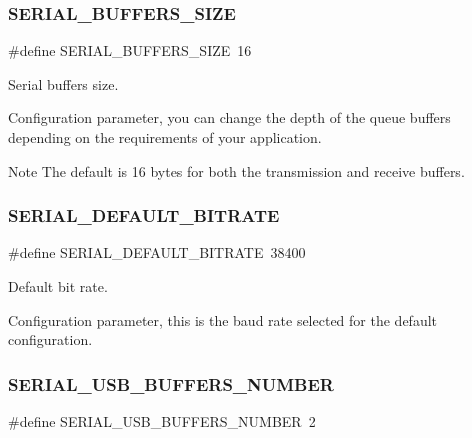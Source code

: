 \subsubsection{\texorpdfstring{S\+E\+R\+I\+A\+L\+\_\+\+B\+U\+F\+F\+E\+R\+S\+\_\+\+S\+I\+ZE}{SERIAL\_BUFFERS\_SIZE}}
{\footnotesize\ttfamily \#define S\+E\+R\+I\+A\+L\+\_\+\+B\+U\+F\+F\+E\+R\+S\+\_\+\+S\+I\+ZE~16}



Serial buffers size. 

Configuration parameter, you can change the depth of the queue buffers depending on the requirements of your application. \begin{DoxyNote}{Note}
The default is 16 bytes for both the transmission and receive buffers. 
\end{DoxyNote}
\hypertarget{group__HAL__CONF_gacb4c08ac23f83ac9d58c50ff840de516}{}\label{group__HAL__CONF_gacb4c08ac23f83ac9d58c50ff840de516} 
\subsubsection{\texorpdfstring{S\+E\+R\+I\+A\+L\+\_\+\+D\+E\+F\+A\+U\+L\+T\+\_\+\+B\+I\+T\+R\+A\+TE}{SERIAL\_DEFAULT\_BITRATE}}
{\footnotesize\ttfamily \#define S\+E\+R\+I\+A\+L\+\_\+\+D\+E\+F\+A\+U\+L\+T\+\_\+\+B\+I\+T\+R\+A\+TE~38400}



Default bit rate. 

Configuration parameter, this is the baud rate selected for the default configuration. \hypertarget{group__HAL__CONF_ga0c332b2493fd2106beb13425549120fe}{}\label{group__HAL__CONF_ga0c332b2493fd2106beb13425549120fe} 
\subsubsection{\texorpdfstring{S\+E\+R\+I\+A\+L\+\_\+\+U\+S\+B\+\_\+\+B\+U\+F\+F\+E\+R\+S\+\_\+\+N\+U\+M\+B\+ER}{SERIAL\_USB\_BUFFERS\_NUMBER}}
{\footnotesize\ttfamily \#define S\+E\+R\+I\+A\+L\+\_\+\+U\+S\+B\+\_\+\+B\+U\+F\+F\+E\+R\+S\+\_\+\+N\+U\+M\+B\+ER~2}



